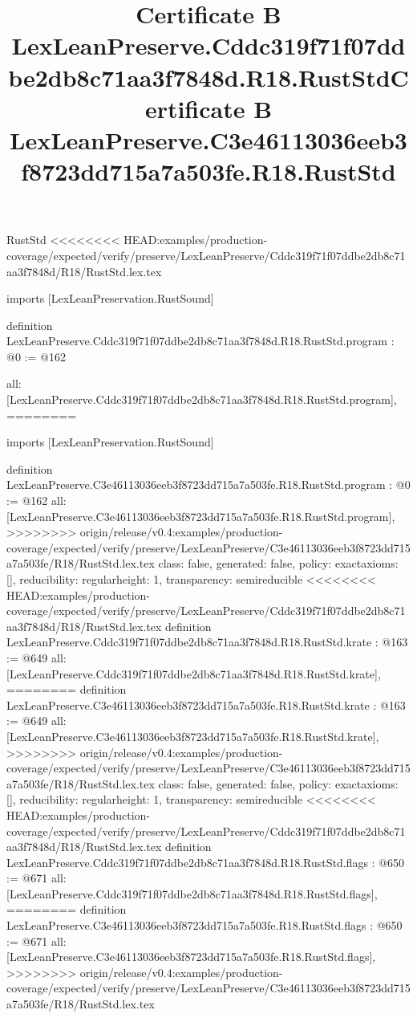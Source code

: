 \begin{lexlean}{RustStd}
<<<<<<<< HEAD:examples/production-coverage/expected/verify/preserve/LexLeanPreserve/Cddc319f71f07ddbe2db8c71aa3f7848d/R18/RustStd.lex.tex
\title{Certificate B LexLeanPreserve.Cddc319f71f07ddbe2db8c71aa3f7848d.R18.RustStd}
\begin{coremodule}
imports [LexLeanPreservation.RustSound]

definition LexLeanPreserve.Cddc319f71f07ddbe2db8c71aa3f7848d.R18.RustStd.program : @0 := @162 {
  all: [LexLeanPreserve.Cddc319f71f07ddbe2db8c71aa3f7848d.R18.RustStd.program],
========
\title{Certificate B LexLeanPreserve.C3e46113036eeb3f8723dd715a7a503fe.R18.RustStd}
\begin{coremodule}
imports [LexLeanPreservation.RustSound]

definition LexLeanPreserve.C3e46113036eeb3f8723dd715a7a503fe.R18.RustStd.program : @0 := @162 {
  all: [LexLeanPreserve.C3e46113036eeb3f8723dd715a7a503fe.R18.RustStd.program],
>>>>>>>> origin/release/v0.4:examples/production-coverage/expected/verify/preserve/LexLeanPreserve/C3e46113036eeb3f8723dd715a7a503fe/R18/RustStd.lex.tex
  class: false,
  generated: false,
  policy: exact{axioms: []},
  reducibility: regular{height: 1},
  transparency: semireducible
}
<<<<<<<< HEAD:examples/production-coverage/expected/verify/preserve/LexLeanPreserve/Cddc319f71f07ddbe2db8c71aa3f7848d/R18/RustStd.lex.tex
definition LexLeanPreserve.Cddc319f71f07ddbe2db8c71aa3f7848d.R18.RustStd.krate : @163 := @649 {
  all: [LexLeanPreserve.Cddc319f71f07ddbe2db8c71aa3f7848d.R18.RustStd.krate],
========
definition LexLeanPreserve.C3e46113036eeb3f8723dd715a7a503fe.R18.RustStd.krate : @163 := @649 {
  all: [LexLeanPreserve.C3e46113036eeb3f8723dd715a7a503fe.R18.RustStd.krate],
>>>>>>>> origin/release/v0.4:examples/production-coverage/expected/verify/preserve/LexLeanPreserve/C3e46113036eeb3f8723dd715a7a503fe/R18/RustStd.lex.tex
  class: false,
  generated: false,
  policy: exact{axioms: []},
  reducibility: regular{height: 1},
  transparency: semireducible
}
<<<<<<<< HEAD:examples/production-coverage/expected/verify/preserve/LexLeanPreserve/Cddc319f71f07ddbe2db8c71aa3f7848d/R18/RustStd.lex.tex
definition LexLeanPreserve.Cddc319f71f07ddbe2db8c71aa3f7848d.R18.RustStd.flags : @650 := @671 {
  all: [LexLeanPreserve.Cddc319f71f07ddbe2db8c71aa3f7848d.R18.RustStd.flags],
========
definition LexLeanPreserve.C3e46113036eeb3f8723dd715a7a503fe.R18.RustStd.flags : @650 := @671 {
  all: [LexLeanPreserve.C3e46113036eeb3f8723dd715a7a503fe.R18.RustStd.flags],
>>>>>>>> origin/release/v0.4:examples/production-coverage/expected/verify/preserve/LexLeanPreserve/C3e46113036eeb3f8723dd715a7a503fe/R18/RustStd.lex.tex
}}}
\end{coremodule}}
\end{coremodule}
\end{lexlean}
